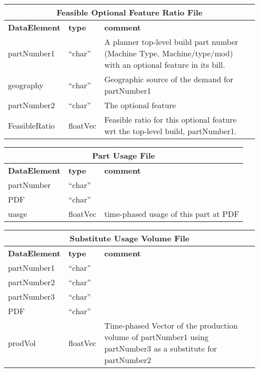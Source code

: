 \vspace{.5in}

\begin{tabular}{llp{4in}}
\multicolumn{3}{c}{{\bf Feasible Optional Feature Ratio File}}\\ \hline\hline
{\bf DataElement} &  {\bf type}  &   {\bf comment} \\ \hline
partNumber1  & ``char'' &       A planner top-level build part number 
                            (Machine Type, Machine/type/mod)
                            with an optional feature in its bill.  \\
geography    & ``char'' &      Geographic source of the demand for partNumber1 \\
partNumber2  & ``char'' &      The optional feature \\

FeasibleRatio    & floatVec &   Feasible ratio for this optional feature wrt
                        the top-level build, partNumber1. \\
\end{tabular}

\vspace{.5in}

\begin{tabular}{llp{4in}}
\multicolumn{3}{c}{{\bf Part Usage File}}\\ \hline\hline
{\bf DataElement} &  {\bf type}  &   {\bf comment} \\ \hline
partNumber &  ``char''     \\ 
PDF   & ``char''  \\
uasge          & floatVec &  time-phased usage of this part at PDF\\
\end{tabular}

\vspace{.5in}

\begin{tabular}{llp{4in}}
\multicolumn{3}{c}{{\bf Substitute Usage Volume File}}\\ \hline\hline
{\bf DataElement} &  {\bf type}  &   {\bf comment} \\ \hline
partNumber1 & ``char''  \\
partNumber2 & ``char''  \\
partNumber3 & ``char''  \\
PDF        & ``char''  \\
prodVol    & floatVec &  Time-phased Vector of the production volume of
                      partNumber1 using partNumber3 as a substitute for
                      partNumber2 \\
\end{tabular}

